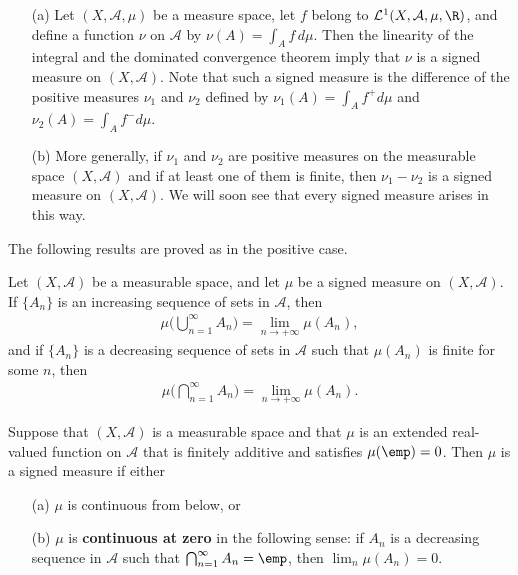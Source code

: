 \begin{example}
\mbox{}
\begin{itemize}
\item[(a)] Let $(X,\mathcal{A},\mu)$ be a measure space, let $f$ belong to $\mathcal{L}^1(X,\mathcal{A},\mu,\R)$, and define a function $\nu$ on $\mathcal{A}$ by $\nu(A)=\int_Af\,d\mu$. Then the linearity of the integral and the dominated convergence theorem imply that $\nu$ is a signed measure on $(X,\mathcal{A})$. Note that such a signed measure is the difference of the positive measures $\nu_1$ and $\nu_2$ defined by $\nu_1(A)=\int_Af^+d\mu$ and $\nu_2(A)=\int_Af^-d\mu$.
\item[(b)] More generally, if $\nu_1$ and $\nu_2$ are positive measures on the measurable space $(X,\mathcal{A})$ and if at least one of them is finite, then $\nu_1-\nu_2$ is a signed measure on $(X,\mathcal{A})$. We will soon see that every signed measure arises in this way.
\end{itemize}
\end{example}
The following results are proved as in the positive case.
\begin{lemma}\label{signed measure continuous}
Let $(X,\mathcal{A})$ be a measurable space, and let $\mu$ be a signed measure on $(X,\mathcal{A})$. If $\{A_n\}$ is an increasing sequence of sets in $\mathcal{A}$, then
\begin{align*}
\mu\Big(\bigcup_{n=1}^{\infty}A_n)=\lim_{n\to+\infty}\mu(A_n),
\end{align*}
and if $\{A_n\}$ is a decreasing sequence of sets in $\mathcal{A}$ such that $\mu(A_n)$ is finite for some $n$, then
\begin{align*}
\mu\Big(\bigcap_{n=1}^{\infty}A_n)=\lim_{n\to+\infty}\mu(A_n).
\end{align*}
\end{lemma}
\begin{lemma}\label{signed measure sigma-add iff continuous}
Suppose that $(X,\mathcal{A})$ is a measurable space and that $\mu$ is an extended real-valued function on $\mathcal{A}$ that is finitely additive and satisfies $\mu(\emp)=0$. Then $\mu$ is a signed measure if either
\begin{itemize}
\item[(a)] $\mu$ is continuous from below, or
\item[(b)] $\mu$ is \textbf{continuous at zero} in the following sense: if $A_n$ is a decreasing sequence in $\mathcal{A}$ such that $\bigcap_{n=1}^{\infty}A_n=\emp$, then $\lim_n\mu(A_n)=0$.
\end{itemize}
\end{lemma}
